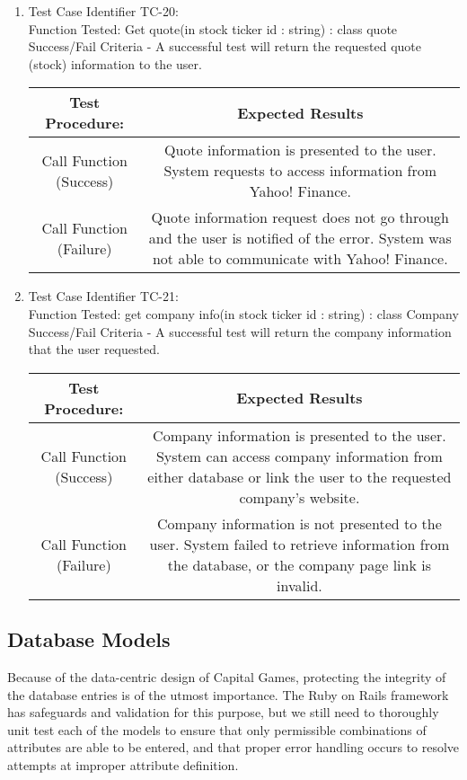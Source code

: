 \begin{enumerate}
  \item
  Test Case Identifier TC-20:\\
    Function Tested: Get quote(in stock ticker id : string) : class quote \\
    Success/Fail Criteria - A successful test will return the requested quote
    (stock) information to the user. \\
    \begin{tabular}{| c | c |}
    \hline
    \textbf{Test Procedure:} & \textbf{Expected Results} \\ \hline
    Call Function (Success) & Quote information is presented to the user. System
    requests to access information from Yahoo! Finance.
    \\ \hline
    Call Function (Failure) & Quote information request does not go through and
    the user is notified of the error. System was not able to communicate with
    Yahoo! Finance. \\ \hline
    \end{tabular}
  \item
  Test Case Identifier TC-21:\\
    Function Tested: get company info(in stock ticker id : string) : class
    Company \\
    Success/Fail Criteria - A successful test will return the company
    information that the user requested. \\
    \begin{tabular}{| c | c |}
    \hline
    \textbf{Test Procedure:} & \textbf{Expected Results} \\ \hline
    Call Function (Success) & Company information is presented to the user.
    System can access company information from either database or link the user
    to the requested company’s website.
    \\ \hline
    Call Function (Failure) & Company information is not presented to the user.
    System failed to retrieve information from the database, or the company
    page link is invalid. \\ \hline
    \end{tabular}
\end{enumerate}
\subsection{Database Models}

Because of the data-centric design of Capital Games, protecting 
the integrity of the database entries is of the utmost importance. 
The Ruby on Rails framework has safeguards and validation for this 
purpose, but we still need to thoroughly unit test each of the 
models to ensure that only permissible combinations of attributes 
are able to be entered, and that proper error handling occurs to 
resolve attempts at improper attribute definition.

